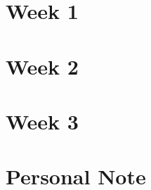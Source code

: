 \documentclass[12pt,oneside,a4paper]{book}
\begin{document}
\tableofcontents



\listoffigures

\lstlistoflistings


\listofmyaligns

\chapter{Week 1} 


\chapter{Week 2}


\chapter{Week 3}


\chapter{Personal Note}


\end{document}
